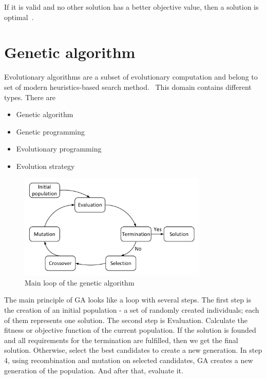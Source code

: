 If it is valid and no other solution has a better objective value, then a solution is optimal~\cite{gotz18}.

\section{Genetic algorithm}
\label{sec:GeneticAlgorithm}

Evolutionary algorithms are a subset of evolutionary computation and belong to set of modern heuristics-based search method.~\cite{vikhar16}
This domain contains different types.
There are

\begin{itemize}
	\item Genetic algorithm 
	\item Genetic programming
	\item Evolutionary programming
	\item Evolution strategy
\end{itemize}

\begin{figure}
	\centering
	\includegraphics[width=0.8\textwidth]{images/GeneticLoop}
	\caption[Main loop of the genetic algorithm]{Main loop of the genetic algorithm}
	\label{fig:GeneticLoop}
\end{figure}

The main principle of GA looks like a loop with several steps.
The first step is the creation of an initial population - a set of randomly created individuals; each of them represents one solution. 
The second step is Evaluation. Calculate the fitness or objective function of the current population.
If the solution is founded and all requirements for the termination are fulfilled, then we get the final solution. Otherwise, select the best candidates to create a new generation.
In step 4, using recombination and mutation on selected candidates, GA creates a new generation of the population. And after that, evaluate it.

